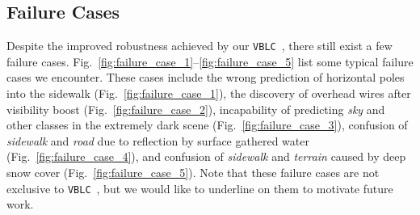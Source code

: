 \documentclass[letterpaper]{article} \usepackage{aaai23}  \usepackage{times}  \usepackage{helvet}  \usepackage{courier}  \usepackage[hyphens]{url}  \usepackage{graphicx} \urlstyle{rm} \def\UrlFont{\rm}  \usepackage{natbib}  \usepackage{caption} \frenchspacing  \setlength{\pdfpagewidth}{8.5in}  \setlength{\pdfpageheight}{11in}  \usepackage{algorithm}
\newcommand{\method}{\texttt{VBLC}~}
\begin{document}
\subsection{Failure Cases}
\label{sec:failure}
Despite the improved robustness achieved by our \method, there still exist a few failure cases. Fig.~\ref{fig:failure_case_1}--\ref{fig:failure_case_5} list some typical failure cases we encounter. These cases include the wrong prediction of horizontal poles into the sidewalk (Fig.~\ref{fig:failure_case_1}), the discovery of overhead wires after visibility boost (Fig.~\ref{fig:failure_case_2}), incapability of predicting \textit{sky} and other classes in the extremely dark scene (Fig.~\ref{fig:failure_case_3}), confusion of \textit{sidewalk} and \textit{road} due to reflection by surface gathered water (Fig.~\ref{fig:failure_case_4}), and confusion of \textit{sidewalk} and \textit{terrain} caused by deep snow cover (Fig.~\ref{fig:failure_case_5}). Note that these failure cases are not exclusive to \method, but we would like to underline on them to motivate future work.
\end{document}
